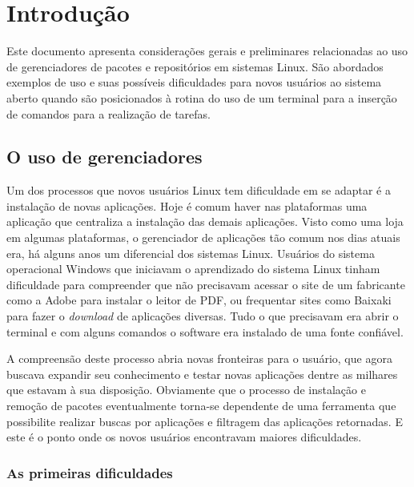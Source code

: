 \chapter*[Introdução]{Introdução}

Este documento apresenta considerações gerais e preliminares relacionadas 
ao uso de gerenciadores de pacotes e repositórios em sistemas Linux. São abordados 
exemplos de uso e suas possíveis dificuldades para novos usuários ao sistema
aberto quando são posicionados à rotina do uso de um terminal para a inserção
de comandos para a realização de tarefas.

\section*{O uso de gerenciadores} %
\label{sec:o_uso_de_gerenciadores}


Um dos processos  que novos usuários Linux tem dificuldade em se adaptar é a instalação de novas aplicações. Hoje é comum haver nas plataformas uma aplicação que centraliza a instalação das demais aplicações. Visto como uma loja em algumas plataformas, o gerenciador de aplicações tão comum nos dias atuais era, há alguns anos um diferencial dos sistemas Linux. Usuários do sistema operacional Windows que iniciavam o aprendizado do sistema Linux  tinham dificuldade para compreender que não precisavam acessar o site de um fabricante como a Adobe para instalar o leitor de PDF, ou frequentar sites como Baixaki para fazer o \textit{download} de aplicações diversas. Tudo o que precisavam era abrir o terminal e com alguns comandos o software era instalado de uma fonte confiável. 

A compreensão deste processo abria novas fronteiras para o  usuário, que agora buscava expandir seu conhecimento e testar novas aplicações dentre as milhares que estavam à sua disposição. Obviamente que o processo de instalação e remoção de pacotes eventualmente torna-se dependente de uma ferramenta que possibilite realizar buscas por aplicações e filtragem das aplicações retornadas. E este é o ponto onde os novos usuários encontravam maiores dificuldades. 

\subsection*{As primeiras dificuldades} %
\label{sub:as_primeiras_dificuldades}

